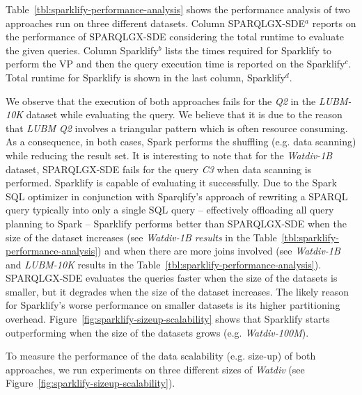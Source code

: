 Table~\ref{tbl:sparklify-performance-analysis} shows the performance analysis of two approaches run on three different datasets.
Column SPARQLGX-SDE$^{a}$ reports on the performance of SPARQLGX-SDE considering the total runtime to evaluate the given queries.
Column Sparklify$^{b}$ lists the times required for Sparklify to perform the \gls{VP} and then the query execution time is reported on the Sparklify$^{c}$.
Total runtime for Sparklify is shown in the last column, Sparklify$^{d}$.

We observe that the execution of both approaches fails for the \textit{Q2} in the \textit{LUBM-10K} dataset while evaluating the query. 
We believe that it is due to the reason that \textit{LUBM Q2} involves a triangular pattern which is often resource consuming. 
As a consequence, in both cases, Spark performs the shuffling (e.g. data scanning) while reducing the result set.
It is interesting to note that for the \textit{Watdiv-1B} dataset, SPARQLGX-SDE fails for the query \textit{C3} when data scanning is performed. 
Sparklify is capable of evaluating it successfully.
Due to the Spark SQL optimizer in conjunction with Sparqlify's approach of rewriting a SPARQL query typically into only a single SQL query -- effectively offloading all query planning to Spark -- Sparklify performs better than SPARQLGX-SDE when the size of the dataset increases (see \textit{Watdiv-1B results} in the Table~\ref{tbl:sparklify-performance-analysis}) and when there are more joins involved (see \textit{Watdiv-1B} and \textit{LUBM-10K} results in the Table~\ref{tbl:sparklify-performance-analysis}).
SPARQLGX-SDE evaluates the queries faster when the size of the datasets is smaller, but it degrades when the size of the dataset increases.
The likely reason for Sparklify's worse performance on smaller datasets is its higher partitioning overhead.
Figure~\ref{fig:sparklify-sizeup-scalability} shows that Sparklify starts outperforming when the size of the datasets grows (e.g. \textit{Watdiv-100M}).

To measure the performance of the data scalability (e.g. size-up) of both approaches, we run experiments on three different sizes of \textit{Watdiv} (see Figure~\ref{fig:sparklify-sizeup-scalability}).

